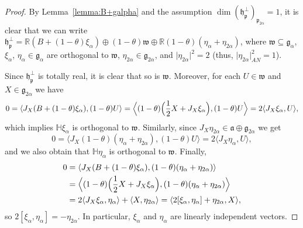 \documentclass[10pt,a4paper]{amsart}
\newcommand{\R}{\mathbb{R}}
\newcommand{\g}{\mathfrak}
\renewcommand{\H}{\mathbb{H}}
\begin{document}
\begin{proof}
By Lemma~\ref{lemma:B+galpha} and the assumption $\dim(\g{h}_{\g{p}}^\perp)_{\g{p}_{2\alpha}}= 1$, it is clear that we can write
$\g{h}_{\g{p}}^\perp
=\R(B+(1-\theta)\xi_\alpha)\oplus(1-\theta)\g{w}\oplus\R(1-\theta)(\eta_\alpha+\eta_{2\alpha})$,
where $\g{w}\subseteq\g{g}_\alpha$, $\xi_\alpha$, $\eta_\alpha\in\g{g}_\alpha$ are orthogonal to $\g{w}$, $\eta_{2\alpha}\in\g{g}_{2\alpha}$, and $\lvert\eta_{2\alpha}\rvert^2=2$ (thus, $\lvert\eta_{2\alpha}\rvert_{AN}^2=1$).

Since $\g{h}_{\g{p}}^\perp$ is totally real, it is clear that so is $\g{w}$.
Moreover, for each $U\in\g{w}$ and $X\in\g{g}_{2\alpha}$ we have
\[
0
=\langle J_X(B+(1-\theta)\xi_\alpha),(1-\theta)U\rangle
=\Bigl\langle (1-\theta)\Bigl(\frac{1}{2}X+J_X\xi_\alpha\Bigr),(1-\theta)U\Bigr\rangle
=2\langle J_X\xi_\alpha,U\rangle,
\]
which implies $\H\xi_\alpha$ is orthogonal to $\g{w}$.
Similarly, since $J_X\eta_{2\alpha}\in\g{a}\oplus\g{g}_{2\alpha}$ we get
\[
0
=\langle J_X(1-\theta)(\eta_\alpha+\eta_{2\alpha}),(1-\theta)U\rangle
=2\langle J_X\eta_\alpha,U\rangle,
\]
and we also obtain that $\H\eta_\alpha$ is orthogonal to $\g{w}$.
Finally,
\begin{align*}
0
&{}=\langle J_{X}(B+(1-\theta)\xi_\alpha),(1-\theta)(\eta_\alpha+\eta_{2\alpha})\rangle\\
&{}=\Bigl\langle (1-\theta)\Bigl(\frac{1}{2}X+J_{X}\xi_\alpha\Bigr),
(1-\theta)(\eta_\alpha+\eta_{2\alpha})\Bigr\rangle\\
&{}=2\langle J_{X}\xi_\alpha,\eta_\alpha\rangle+\langle X,\eta_{2\alpha}\rangle
=\langle 2[\xi_\alpha,\eta_\alpha]+\eta_{2\alpha},X\rangle,
\end{align*}
so $2[\xi_\alpha,\eta_\alpha]=-\eta_{2\alpha}$.
In particular, $\xi_\alpha$ and $\eta_\alpha$ are linearly independent vectors.


\end{proof}
\end{document}

